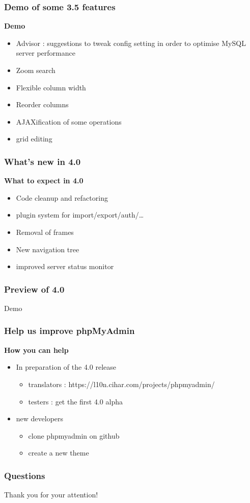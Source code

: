 \documentclass[14pt]{beamer}
\begin{document}
  \begin{frame}
    \frametitle{Demo of some 3.5 features}
    \textbf{Demo}
    \begin{itemize}
      \item Advisor : suggestions to tweak config setting in order to optimise MySQL server performance
      \item Zoom search
      \item Flexible column width
      \item Reorder columns
      \item AJAXification of some operations
      \item grid editing
    \end{itemize}
  \end{frame}
  \begin{frame}
    \frametitle{What's new in 4.0}
    \textbf{What to expect in 4.0}
    \pause
    \begin{itemize}[<+->]
      \item Code cleanup and refactoring
      \item plugin system for import/export/auth/\ldots
      \item Removal of frames
      \item New navigation tree
      \item improved server status monitor
    \end{itemize}
  \end{frame}
  \begin{frame}
     \frametitle{Preview of 4.0}
     Demo
  \end{frame}
  \begin{frame}
  \frametitle{Help us improve phpMyAdmin}
    \textbf{How you can help}
    \pause
    \begin{itemize}[<+->]
      \item In preparation of the 4.0 release
        \begin{itemize}[<+->]
          \item translators : https://l10n.cihar.com/projects/phpmyadmin/
          \item testers : get the first 4.0 alpha
	\end{itemize}
      \item new developers
	\begin{itemize}[<+->]
          \item clone phpmyadmin on github
          \item create a new theme
	\end{itemize}

    \end{itemize}
  \end{frame}
  \begin{frame}
  \frametitle{Questions}
    Thank you for your attention!
  \end{frame}
\end{document}
